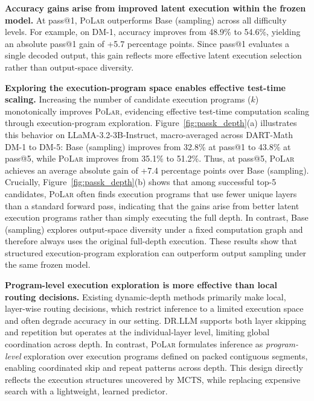 \documentclass{article}
\theoremstyle{plain}
\theoremstyle{definition}
\theoremstyle{remark}
\newcommand\ours{\textsc{PoLar}\xspace}
\begin{document}
\textbf{Accuracy gains arise from improved latent execution within the frozen model.}
At pass@1, \ours outperforms Base (sampling) across all difficulty levels.
For example, on DM-1, accuracy improves from 48.9\% to 54.6\%, yielding an absolute pass@1 gain of +5.7 percentage points.
Since pass@1 evaluates a single decoded output, this gain reflects more effective latent
execution selection rather than output-space diversity.



\textbf{Exploring the execution-program space enables effective test-time scaling.}
Increasing the number of candidate execution programs ($k$) monotonically improves \ours, evidencing effective test-time computation scaling through execution-program exploration.
Figure~\ref{fig:passk_depth}(a) illustrates this behavior on LLaMA-3.2-3B-Instruct, macro-averaged across DART-Math DM-1 to DM-5: Base (sampling) improves from 32.8\% at pass@1 to 43.8\% at pass@5, while \ours improves from 35.1\% to 51.2\%. Thus, at pass@5, \ours achieves an average absolute gain of +7.4 percentage points over Base (sampling).
Crucially, Figure~\ref{fig:passk_depth}(b) shows that among successful top-5 candidates, \ours often finds execution programs that use fewer unique layers than a standard forward pass, indicating that the gains arise from better latent execution programs rather than simply executing the full depth.
In contrast, Base (sampling) explores output-space diversity under a fixed computation graph and therefore always uses the original full-depth execution.
These results show that structured execution-program exploration can outperform output sampling under the same frozen model.


\textbf{Program-level execution exploration is more effective than local routing decisions.}
Existing dynamic-depth methods primarily make local, layer-wise routing decisions, which restrict inference to a limited execution space and often degrade accuracy in our setting.
DR.LLM supports both layer skipping and repetition but operates at the individual-layer level, limiting global coordination across depth.
In contrast, \ours formulates inference as \emph{program-level} exploration over execution programs defined on packed contiguous segments, enabling coordinated skip and repeat patterns across depth.
This design directly reflects the execution structures uncovered by MCTS, while replacing expensive search with a lightweight, learned predictor.
\end{document}
